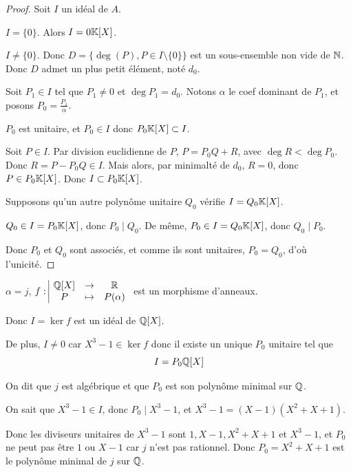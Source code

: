 \begin{proof}
    Soit $I$ un idéal de $A$. 

     $I = \{0\}$. Alors $I = 0 \mathbb{K}[X]$.

     $I \neq \{0\}$. Donc $D = \{\deg(P), P \in I \setminus \{0\}\}$ 
    est un sous-ensemble non vide de $\mathbb{N}$. Donc $D$ admet un plus petit élément, noté $d_0$.

    Soit $P_1 \in I$ tel que $P_1 \neq 0 $ et $\deg P_1 = d_0$. Notons $\alpha$ le coef dominant 
    de $P_1$, et posons $P_0 = \frac{P_1} \alpha$. 

    $P_0$ est unitaire, et $P_0 \in I$ donc $P_0 \mathbb{K}[X] \subset I$.

    \avspace Soit $P \in I$. Par division euclidienne de $P$, $P = P_0 Q + R$, avec 
    $\deg R < \deg P_0$. Donc $R = P - P_0 Q \in I$. Mais alors, par minimalté de $d_0$,
    $R = 0$, donc $P \in P_0 \mathbb{K}[X]$. Donc $I \subset P_0 \mathbb{K}[X]$.

    \lvspace Supposons qu'un autre polynôme unitaire $Q_0$ vérifie $I = Q_0 \mathbb{K}[X]$.

    $Q_0 \in I = P_0 \mathbb{K}[X]$, donc $P_0 \mid Q_0$. De même, $P_0 \in I = Q_0 \mathbb{K}[X]$, donc $Q_0 \mid P_0$.

    Donc $P_0$ et $Q_0$ sont associés, et comme ils sont unitaires, $P_0 = Q_0$, d'où l'unicité.
\end{proof}

\begin{exemple}
    $\alpha = j$, $f: \space \begin{array}{|ccc} \displaystyle \mathbb{Q}[X] & \to & \displaystyle \mathbb{R} \\ \displaystyle P & \mapsto & \displaystyle P(\alpha) \end{array}$ est un morphisme d'anneaux.

    Donc $I = \ker f$ est un idéal de $\mathbb{Q}[X]$.

    De plus, $I \neq 0$ car $X^3 - 1 \in \ker f$ donc il existe un unique $P_0$ unitaire
    tel que $$I = P_0 \mathbb{Q}[X]$$

    On dit que $j$ est algébrique et que $P_0$ est son polynôme minimal sur $\mathbb{Q}$.

    On sait que $X^3 - 1 \in I$, donc $P_0 \mid X^3 - 1$, et 
    $X^3 - 1 = (X - 1)(X^2 + X + 1)$. 

    Donc les diviseurs unitaires de $X^3 - 1$ sont $1, X - 1, X^2 + X + 1$ et $X^3 - 1$, et 
    $P_0$ ne peut pas être $1$ ou $X - 1$ car $j$ n'est pas rationnel. 
    Donc $P_0 = X^2 + X + 1$ est le polynôme minimal de $j$ sur $\mathbb{Q}$.


\end{exemple}

